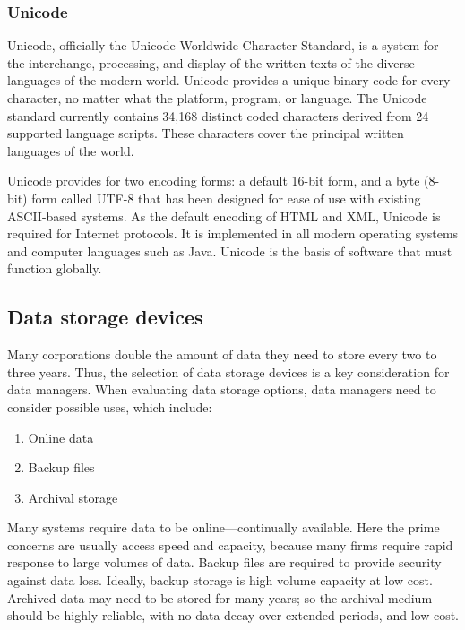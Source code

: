 \documentclass[
]{article}
\begin{document}
\hypertarget{unicode}{%
\subsubsection*{Unicode}\label{unicode}}

Unicode, officially the Unicode Worldwide Character Standard, is a
system for the interchange, processing, and display of the written texts
of the diverse languages of the modern world. Unicode provides a unique
binary code for every character, no matter what the platform, program,
or language. The Unicode standard currently contains 34,168 distinct
coded characters derived from 24 supported language scripts. These
characters cover the principal written languages of the world.

Unicode provides for two encoding forms: a default 16-bit form, and a
byte (8-bit) form called UTF-8 that has been designed for ease of use
with existing ASCII-based systems. As the default encoding of HTML and
XML, Unicode is required for Internet protocols. It is implemented in
all modern operating systems and computer languages such as Java.
Unicode is the basis of software that must function globally.

\hypertarget{data-storage-devices}{%
\subsection*{Data storage devices}\label{data-storage-devices}}

Many corporations double the amount of data they need to store every two
to three years. Thus, the selection of data storage devices is a key
consideration for data managers. When evaluating data storage options,
data managers need to consider possible uses, which include:

\begin{enumerate}
\def\labelenumi{\arabic{enumi}.}
\item
  Online data
\item
  Backup files
\item
  Archival storage
\end{enumerate}

Many systems require data to be online---continually available. Here the
prime concerns are usually access speed and capacity, because many firms
require rapid response to large volumes of data. Backup files are
required to provide security against data loss. Ideally, backup storage
is high volume capacity at low cost. Archived data may need to be stored
for many years; so the archival medium should be highly reliable, with
no data decay over extended periods, and low-cost.
\end{document}
